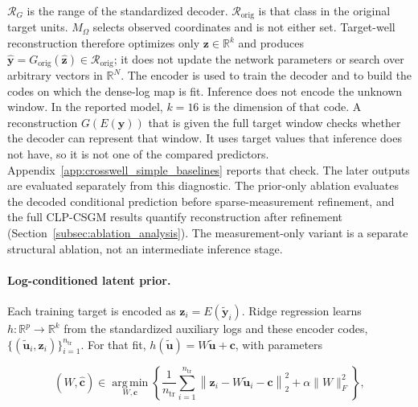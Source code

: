 $\mathcal{R}_{G}$ is the range of the standardized decoder.
$\mathcal{R}_{\mathrm{orig}}$ is that class in the original target units.
$M_{\Omega}$ selects observed coordinates and is not either set.
Target-well reconstruction therefore optimizes only
$\boldsymbol{z}\in\mathbb{R}^{k}$ and produces
$\widehat{\boldsymbol{y}}
=G_{\mathrm{orig}}(\widehat{\boldsymbol{z}})
\in\mathcal{R}_{\mathrm{orig}}$; it does not update the network
parameters or search over arbitrary vectors in $\mathbb{R}^{N}$.
The encoder is used to train the decoder and to build the codes on which
the dense-log map is fit. Inference does not encode the unknown window.
In the reported model, $k=16$ is the dimension of that code.
A reconstruction $G(E(\boldsymbol{y}))$ that is given the full target window
checks whether the decoder can represent that window. It uses target values
that inference does not have, so it is not one of the compared predictors.
Appendix~\ref{app:crosswell_simple_baselines} reports that check.
The later outputs are evaluated separately from this diagnostic.
The prior-only ablation evaluates the decoded conditional prediction before
sparse-measurement refinement, and the full CLP-CSGM results quantify
reconstruction after refinement
(Section~\ref{subsec:ablation_analysis}).
The measurement-only variant is a separate structural ablation, not an
intermediate inference stage.

\paragraph{Log-conditioned latent prior.}
Each training target is encoded as
$\boldsymbol{z}_i=E(\widetilde{\boldsymbol{y}}_i)$.
Ridge regression learns
$h:\mathbb{R}^{p}\rightarrow\mathbb{R}^{k}$ from the standardized auxiliary
logs and these encoder codes,
$\{(\widetilde{\boldsymbol{u}}_i,\boldsymbol{z}_i)\}_{i=1}^{n_{\mathrm{tr}}}$.
For that fit,
$h(\widetilde{\boldsymbol{u}})
=W\widetilde{\boldsymbol{u}}+\boldsymbol{c}$, with parameters

\begin{equation}
(\widehat{W},\widehat{\boldsymbol{c}})
\in
\operatorname*{arg\,min}_{W,\boldsymbol{c}}
\left\{
\frac{1}{n_{\mathrm{tr}}}
\sum_{i=1}^{n_{\mathrm{tr}}}
\left\|
\boldsymbol{z}_i
-
W\widetilde{\boldsymbol{u}}_i
-
\boldsymbol{c}
\right\|_2^2
+
\alpha\|W\|_F^2
\right\},
\label{eq:ridge_latent_training_objective}
\end{equation}

